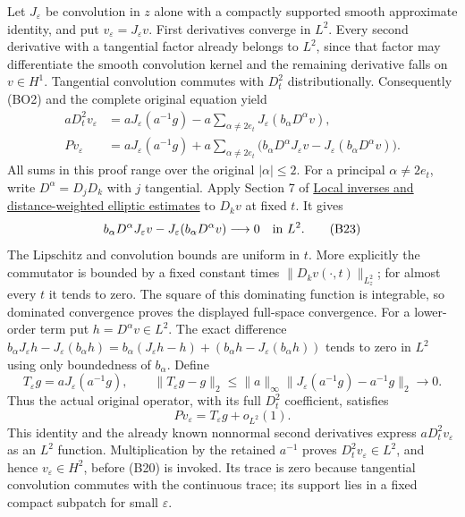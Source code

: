 \documentclass[
  11pt,
]{article}
\begin{document}
Let \(J_\varepsilon\) be convolution in \(z\) alone with a compactly
supported smooth approximate identity, and put
\(v_\varepsilon=J_\varepsilon v\). First derivatives converge in
\(L^2\). Every second derivative with a tangential factor already
belongs to \(L^2\), since that factor may differentiate the smooth
convolution kernel and the remaining derivative falls on \(v\in H^1\).
Tangential convolution commutes with \(D_t^2\) distributionally.
Consequently (BO2) and the complete original equation yield \[
 \begin{split}
 aD_t^2v_\varepsilon
 &=aJ_\varepsilon(a^{-1}g)
   -a\sum_{\alpha\ne2e_t}J_\varepsilon(b_\alpha D^\alpha v),\\
 Pv_\varepsilon
 &=aJ_\varepsilon(a^{-1}g)
   +a\sum_{\alpha\ne2e_t}
      \big(b_\alpha D^\alpha J_\varepsilon v
                  -J_\varepsilon(b_\alpha D^\alpha v)\big).
 \end{split}
 \tag{BO3}
\] All sums in this proof range over the original \(|\alpha|\leq2\). For
a principal \(\alpha\ne2e_t\), write \(D^\alpha=D_jD_k\) with \(j\)
tangential. Apply Section 7 of
\href{local-elliptic-coefficients.pdf}{Local inverses and
distance-weighted elliptic estimates} to \(D_kv\) at fixed \(t\). It
gives \[
 b_\alpha D^\alpha J_\varepsilon v
       -J_\varepsilon(b_\alpha D^\alpha v)
 \longrightarrow0\quad\hbox{in }L^2.
 \tag{B23}
\] The Lipschitz and convolution bounds are uniform in \(t\). More
explicitly the commutator is bounded by a fixed constant times
\(\|D_kv(\cdot,t)\|_{L^2_z}\); for almost every \(t\) it tends to zero.
The square of this dominating function is integrable, so dominated
convergence proves the displayed full-space convergence. For a
lower-order term put \(h=D^\alpha v\in L^2\). The exact difference
\(b_\alpha J_\varepsilon h-J_\varepsilon(b_\alpha h)
=b_\alpha(J_\varepsilon h-h)+(b_\alpha h-J_\varepsilon(b_\alpha h))\)
tends to zero in \(L^2\) using only boundedness of \(b_\alpha\). Define
\[
 T_\varepsilon g=aJ_\varepsilon(a^{-1}g),\qquad
 \|T_\varepsilon g-g\|_2
 \leq\|a\|_\infty
       \|J_\varepsilon(a^{-1}g)-a^{-1}g\|_2\longrightarrow0.
 \tag{BO4}
\] Thus the actual original operator, with its full \(D_t^2\)
coefficient, satisfies \[
 Pv_\varepsilon=T_\varepsilon g+o_{L^2}(1).
 \tag{B24}
\] This identity and the already known nonnormal second derivatives
express \(aD_t^2v_\varepsilon\) as an \(L^2\) function. Multiplication
by the retained \(a^{-1}\) proves \(D_t^2v_\varepsilon\in L^2\), and
hence \(v_\varepsilon\in H^2\), before (B20) is invoked. Its trace is
zero because tangential convolution commutes with the continuous trace;
its support lies in a fixed compact subpatch for small \(\varepsilon\).
\end{document}
